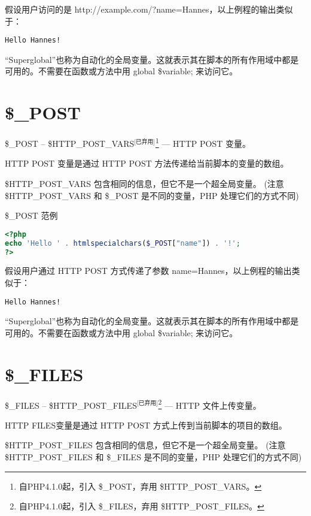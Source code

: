 假设用户访问的是 http://example.com/?name=Hannes，以上例程的输出类似于：

\begin{verbatim}
Hello Hannes!
\end{verbatim}


“Superglobal”也称为自动化的全局变量。这就表示其在脚本的所有作用域中都是可用的。不需要在函数或方法中用 global \$variable; 来访问它。



\section{\$\_POST}

\$\_POST -- \$HTTP\_POST\_VARS$^{\text{[已弃用]}}$\footnote{自PHP4.1.0起，引入 \$\_POST，弃用 \$HTTP\_POST\_VARS。} — HTTP POST 变量。

HTTP POST 变量是通过 HTTP POST 方法传递给当前脚本的变量的数组。

\$HTTP\_POST\_VARS 包含相同的信息，但它不是一个超全局变量。 (注意 \$HTTP\_POST\_VARS 和 \$\_POST 是不同的变量，PHP 处理它们的方式不同)



\begin{example}
\$\_POST 范例
\begin{lstlisting}[language=PHP]
<?php
echo 'Hello ' . htmlspecialchars($_POST["name"]) . '!';
?>
\end{lstlisting}
\end{example}

假设用户通过 HTTP POST 方式传递了参数 name=Hannes，以上例程的输出类似于：

\begin{verbatim}
Hello Hannes!
\end{verbatim}


“Superglobal”也称为自动化的全局变量。这就表示其在脚本的所有作用域中都是可用的。不需要在函数或方法中用 global \$variable; 来访问它。


\section{\$\_FILES}

\$\_FILES -- \$HTTP\_POST\_FILES$^{\text{[已弃用]}}$\footnote{自PHP4.1.0起，引入 \$\_FILES，弃用 \$HTTP\_POST\_FILES。} — HTTP 文件上传变量。

HTTP FILES变量是通过 HTTP POST 方式上传到当前脚本的项目的数组。

\$HTTP\_POST\_FILES 包含相同的信息，但它不是一个超全局变量。 (注意 \$HTTP\_POST\_FILES 和 \$\_FILES 是不同的变量，PHP 处理它们的方式不同)

